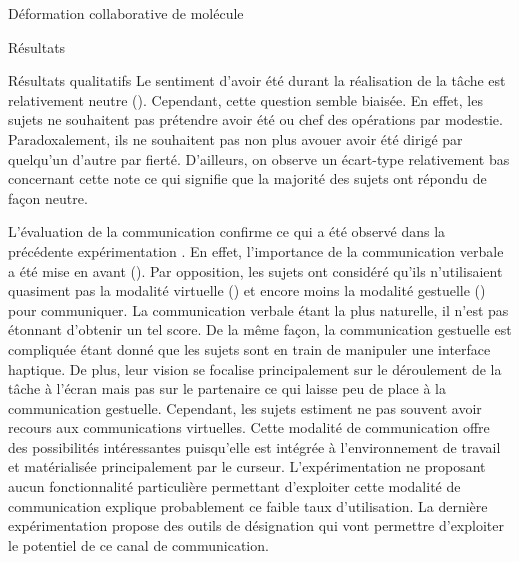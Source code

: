 \documentclass[myfrancais,ngerman,english,frenchb]{mythesis}
\begin{document}
\begin{mychapter}{Déformation collaborative de molécule}
\begin{mysection}{Résultats}
\begin{mysubsection}{Résultats qualitatifs}
				Le sentiment d'avoir été  durant la réalisation de la tâche est relativement neutre ().
				Cependant, cette question semble biaisée.
				En effet, les sujets ne souhaitent pas prétendre avoir été  ou chef des opérations par modestie.
				Paradoxalement, ils ne souhaitent pas non plus avouer avoir été dirigé par quelqu'un d'autre par fierté.
				D'ailleurs, on observe un écart-type relativement bas concernant cette note ce qui signifie que la majorité des sujets ont répondu de façon neutre.

				L'évaluation de la communication confirme ce qui a été observé dans la précédente expérimentation .
				En effet, l'importance de la communication verbale a été mise en avant ().
				Par opposition, les sujets ont considéré qu'ils n'utilisaient quasiment pas la modalité virtuelle () et encore moins la modalité gestuelle () pour communiquer.
				La communication verbale étant la plus naturelle, il n'est pas étonnant d'obtenir un tel score.
				De la même façon, la communication gestuelle est compliquée étant donné que les sujets sont en train de manipuler une interface haptique.
				De plus, leur vision se focalise principalement sur le déroulement de la tâche à l'écran mais pas sur le partenaire ce qui laisse peu de place à la communication gestuelle.
				Cependant, les sujets estiment ne pas souvent avoir recours aux communications virtuelles.
				Cette modalité de communication offre des possibilités intéressantes puisqu'elle est intégrée à l'environnement de travail et matérialisée principalement par le curseur.
				L'expérimentation ne proposant aucun fonctionnalité particulière permettant d'exploiter cette modalité de communication explique probablement ce faible taux d'utilisation.
				La dernière expérimentation  propose des outils de désignation qui vont permettre d'exploiter le potentiel de ce canal de communication.


\end{mysubsection}
\end{mysection}
\end{mychapter}
\end{document}
